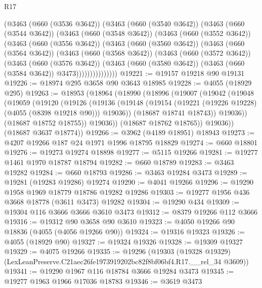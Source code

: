 \begin{lexlean}{R17}
\begin{coremodule}
        (@3463
          (@660 (@3536 @3642))
          (@3463
            (@660 (@3540 @3642))
            (@3463
              (@660 (@3544 @3642))
              (@3463
                (@660 (@3548 @3642))
                (@3463
                  (@660 (@3552 @3642))
                  (@3463
                    (@660 (@3556 @3642))
                    (@3463
                      (@660 (@3560 @3642))
                      (@3463
                        (@660 (@3564 @3642))
                        (@3463
                          (@660 (@3568 @3642))
                          (@3463
                            (@660 (@3572 @3642))
                            (@3463
                              (@660 (@3576 @3642))
                              (@3463
                                (@660 (@3580 @3642))
                                (@3463 (@660 (@3584 @3642)) @3473)))))))))))))))
@19221 := @19157 @19218 @90 @19131
@19226 := @18974 @295 @3658 @90 @3643 @18985
@19228 := @4055 (@18929 @295)
@19263 := @18953
    (@18964
      (@18990
        (@18996
          (@19007
            (@19042
              (@19048
                (@19059
                  (@19120
                    (@19126
                      (@19136
                        (@19148 (@19154 (@19221 (@19226 @19228) (@4055 (@8398 @19218 @90))) @19036))
                        (@18687 @18741 @18743))
                      @19036))
                  (@18687 @18752 @18755))
                @19036))
            (@18687 @18762 @18765))
          @19036))
      (@18687 @3637 @18774))
@19266 := @3962 (@4189 @18951) @18943
@19273 := @4207 @19266 @187 @24 @1971 @1996 @18795 @18829
@19274 := @660 @18801
@19276 := @19273 @19274 @18898
@19277 := @5115 @19266
@19281 := @19277 @1461 @1970 @18787 @18794
@19282 := @660 @18789
@19283 := @3463 @19282
@19284 := @660 @18793
@19286 := @3463 @19284 @3473
@19289 := @19281 (@19283 @19286) @19274
@19290 := @4041 @19266
@19296 := @19290 @1958 @1969 @18779 @18786 @19282 @19286
@19303 := @19277 @1956 @436 @3668 @18778 (@3611 @3473) @19282
@19304 := @19290 @434
@19309 := @19304 @116 @3666 @3666 @3610 @3473
@19312 := @8379 @19266 @112 @3666
@19316 := @19312 @90 @3658 @90 @3610
@19323 := @4050 @19266 @90 @18836 (@4055 (@4056 @19266 @90))
@19324 := @19316 @19323
@19326 := @4055 (@18929 @90)
@19327 := @19324 @19326
@19328 := @19309 @19327
@19329 := @4075 @19266
@19335 := @19296
    (@19303 (@19328 @19329) (LexLeanPreserve.C21aec26fe1973919202bc82f8bf06bf4.R17.__rel_34 @3609))
@19341 := @19290 @1967 @116 @18784 @3666 @19284 @3473
@19345 := @19277 @1963 @1966 @17036 @18783
@19346 := @3619 @3473

\end{coremodule}
\end{lexlean}
